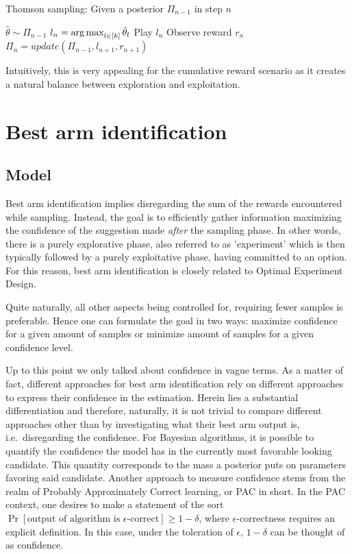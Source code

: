 \begin{algorithm}[H]
    \caption{Thomson sampling: Given a posterior $\Pi_{n-1}$ in step $n$}
    \label{alg:thompson_sampling}
  \begin{algorithmic}
    \State $\hat{\theta} \sim \Pi_{n-1}$
    \State $l_n = \operatorname*{arg\,max}_{l \in [k]}\hat{\theta}_l$
    \State Play $l_n$
    \State Observe reward $r_n$
    \State $\Pi_n = update(\Pi_{n-1}, l_{n+1}, r_{n+1})$
  \end{algorithmic}
\end{algorithm}

Intuitively, this is very appealing for the cumulative reward scenario as it
creates a natural balance between exploration and exploitation.

\section{Best arm identification}
\subsection{Model}\label{ss:top-1_model}

Best arm identification implies disregarding the sum of the rewards encountered
while sampling. Instead, the goal is to efficiently gather information
maximizing the confidence of the suggestion made \emph{after} the sampling
phase. In other words, there is a purely explorative phase, also referred to as
'experiment' which is then typically followed by a purely exploitative phase,
having committed to an option. For this reason, best arm identification is
closely related to Optimal Experiment Design.

Quite naturally, all other aspects being controlled for, requiring fewer samples
is preferable. Hence one can formulate the goal in two ways: maximize confidence
for a given amount of samples or minimize amount of samples for a given
confidence level.

Up to this point we only talked about confidence in vague terms. As a matter of
fact, different approaches for best arm identification rely on different
approaches to express their confidence in the estimation. Herein lies a
substantial differentiation and therefore, naturally, it is not trivial to
compare different approaches other than by investigating what their best arm
output is, i.e.\ disregarding the confidence. For Bayesian algorithms, it is
possible to quantify the confidence the model has in the currently most
favorable looking candidate. This quantity corresponds to the mass a posterior
puts on parameters favoring said candidate. Another approach to measure
confidence stems from the realm of Probably Approximately Correct learning, or
PAC in short. In the PAC context, one desires to make a statement of the sort
$\Pr[\text{output of algorithm is $\epsilon$-correct}] \geq 1 - \delta$, where
$\epsilon$-correctness requires an explicit definition. In this case, under the
toleration of $\epsilon$, $1 - \delta$ can be thought of as confidence.

